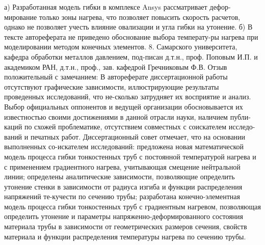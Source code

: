 а) Разработанная модель гибки в комплексе Ansys рассматривает дефор-мирование только зоны нагрева, что позволяет повысить скорость расчетов, однако не позволяет учесть влияние овализации и угла гибки на утонение.
б) В тексте автореферата не приведено обоснование выбора температу-ры нагрева при моделировании методом конечных элементов.
8. Самарского университета, кафедра обработки металлов давлением, под-писан д.т.н., проф. Поповым И.П. и академиком РАН, д.т.н., проф., зав. кафедрой Гречниковым Ф.В. Отзыв положительный с замечанием:
В автореферате диссертационной работы отсутствуют графические зависимости, иллюстрирующие результаты проведенных исследований, что не-сколько затрудняет их восприятие и анализ.
Выбор официальных оппонентов и ведущей организации обосновывается их известностью своими достижениями в данной отрасли науки, наличием публи-каций по схожей проблематике, отсутствием совместных с соискателем исследо-ваний и печатных работ.
Диссертационный совет отмечает, что на основании выполненных со-искателем исследований:
предложена новая математической модель процесса гибки тонкостенных труб с постоянной температурой нагрева и с применением градиентного нагрева, учитывающая смещение нейтральной линии;
определены аналитические зависимости, позволяющие определить утонение стенки в зависимости от радиуса изгиба и функции распределения напряжений те-кучести по сечению трубы;
разработана конечно-элементная модель процесса гибки тонкостенных труб с градиентным нагревом, позволяющая определить утонение и параметры напряженно-деформированного состояния материала трубы в зависимости от геометрических размеров сечения, свойств материала и функции распределения температуры нагрева по сечению трубы.


